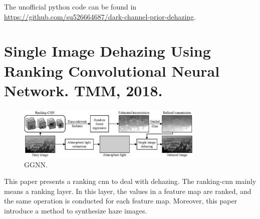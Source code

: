 \documentclass[10pt,onecolumn]{book}
\begin{document}
The unofficial python code can be found in \url{https://github.com/su526664687/dark-channel-prior-dehazing}.

\section{Single Image Dehazing Using Ranking Convolutional Neural Network. TMM, 2018.}
\begin{figure}[h]
\centering
\includegraphics[width=0.8\textwidth]{figures_paper_reading/Single_Image_Dehazing_Using_Ranking_Convolutional_Neural_Network.png}
\caption{GGNN.}
\label{fig}
\end{figure}

This paper presents a ranking cnn to deal with dehazing. The ranking-cnn mainly means a ranking layer. In this layer, the values in a feature map are ranked, and the same operation is conducted for each feature map. Moreover, this paper introduce a method to synthesize haze images.

~\cite{su2019for}

{\small


}
\end{document}
